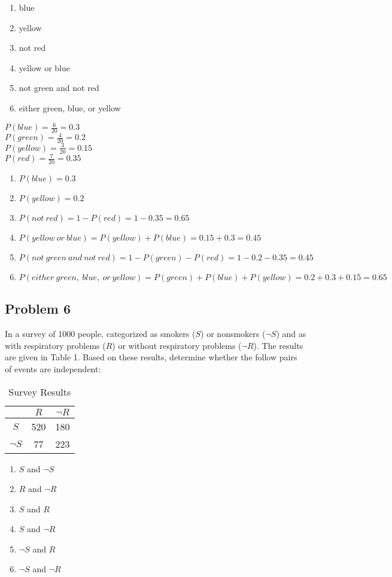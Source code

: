 \documentclass[paper=a4, fontsize=11pt]{scrartcl} %
\numberwithin{equation}{section} %
\numberwithin{figure}{section} %
\newcommand{\problem}[1]{\subsection *{Problem #1}}
\begin{document}
\renewcommand{\labelenumi}{(\alph{enumi})}
\begin{enumerate}
\item blue
\item yellow
\item not red
\item yellow or blue
\item not green and not red
\item either green, blue, or yellow
\end{enumerate}

$P(blue) = \frac{6}{20} = 0.3$\\
$P(green) = \frac{4}{20} = 0.2$\\
$P(yellow) = \frac{3}{20} = 0.15$\\
$P(red) = \frac{7}{20} = 0.35$\\

\begin{enumerate}
\item $P(blue) = 0.3$
\item $P(yellow) = 0.2$
\item $P(not\ red) = 1 - P(red) = 1 - 0.35 = 0.65$
\item $P(yellow\ or\ blue) = P(yellow) + P(blue) = 0.15 + 0.3 = 0.45$
\item $P(not\ green\ and\ not\ red) = 1 - P(green) - P(red) = 1 - 0.2 - 0.35 = 0.45$
\item $P(either\ green,\ blue,\ or\ yellow) = P(green) + P(blue) + P(yellow) = 0.2 + 0.3 + 0.15 = 0.65$
\end{enumerate}

\problem 6 In a survey of 1000 people, categorized as smokers ($S$) or nonsmokers
($\neg S$) and as with respiratory problems ($R$) or without respiratory problems
($\neg R$). The results are given in Table 1.
Based on these results, determine whether the follow pairs of events are independent:

\begin{table}[h]
  \centering
  \begin{tabular}{c | c c}
    & $R$ & $\neg R$ \\ \hline
    $S$ & 520 & 180 \\
    $\neg S$ & 77 & 223 \\
  \end{tabular}
  \caption{Survey Results}

\end{table}

\begin{enumerate}
\item $S$ and $\neg S$
\item $R$ and $\neg R$
\item $S$ and $R$
\item $S$ and $\neg R$
\item $\neg S$ and $R$
\item $\neg S$ and $\neg R$
\end{enumerate}
\end{document}
